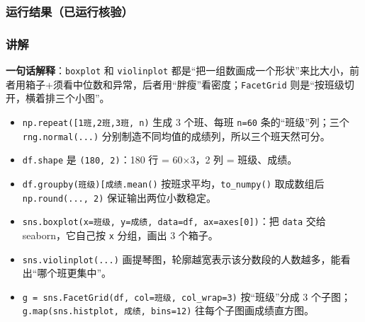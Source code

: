 \subsubsection{运行结果（已运行核验）}\label{ux8fd0ux884cux7ed3ux679cux5df2ux8fd0ux884cux6838ux9a8c-22}

\begin{Shaded}
\begin{Highlighting}[]
\end{Highlighting}
\end{Shaded}

\subsubsection{讲解}\label{ux8bb2ux89e3-22}

\textbf{一句话解释}：\texttt{boxplot} 和 \texttt{violinplot}
都是``把一组数画成一个形状''来比大小，前者用箱子+须看中位数和异常，后者用``胖瘦''看密度；\texttt{FacetGrid}
则是``按班级切开，横着排三个小图''。

\begin{itemize}
\tightlist
\item
  \texttt{np.repeat({[}\textquotesingle{}1班\textquotesingle{},\textquotesingle{}2班\textquotesingle{},\textquotesingle{}3班\textquotesingle{}{]},\ n)}
  生成 3 个班、每班 \texttt{n=60} 条的``班级''列；三个
  \texttt{rng.normal(...)}
  分别制造不同均值的成绩列，所以三个班天然可分。
\item
  \texttt{df.shape} 是 \texttt{(180,\ 2)}：180 行 = 60×3，2 列 =
  班级、成绩。
\item
  \texttt{df.groupby(\textquotesingle{}班级\textquotesingle{}){[}\textquotesingle{}成绩\textquotesingle{}{]}.mean()}
  按班求平均，\texttt{to\_numpy()} 取成数组后 \texttt{np.round(...,\ 2)}
  保证输出两位小数稳定。
\item
  \texttt{sns.boxplot(x=\textquotesingle{}班级\textquotesingle{},\ y=\textquotesingle{}成绩\textquotesingle{},\ data=df,\ ax=axes{[}0{]})}：把
  \texttt{data} 交给 seaborn，它自己按 \texttt{x} 分组，画出 3 个箱子。
\item
  \texttt{sns.violinplot(...)}
  画提琴图，轮廓越宽表示该分数段的人数越多，能看出``哪个班更集中''。
\item
  \texttt{g\ =\ sns.FacetGrid(df,\ col=\textquotesingle{}班级\textquotesingle{},\ col\_wrap=3)}
  按``班级''分成 3
  个子图；\texttt{g.map(sns.histplot,\ \textquotesingle{}成绩\textquotesingle{},\ bins=12)}
  往每个子图画成绩直方图。
\end{itemize}

